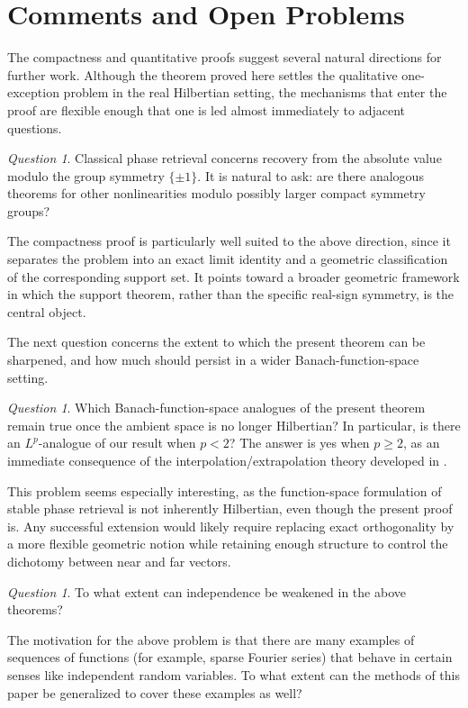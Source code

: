 \documentclass[11pt]{amsart}
\numberwithin{equation}{section}
\theoremstyle{definition}
\theoremstyle{remark}
\newtheorem{question}[theorem]{Question}
\begin{document}
\section{Comments and Open Problems}\label{sec:comments}

The compactness and quantitative proofs suggest several natural directions for
further work.  Although the theorem proved here settles the qualitative
one-exception problem in the real Hilbertian setting, the mechanisms that enter
the proof are flexible enough that one is led almost immediately to adjacent
questions. 


\begin{question}
Classical phase retrieval concerns recovery from the absolute value modulo the group symmetry $\{\pm1\}$.  It is
natural to ask: are there analogous theorems for other nonlinearities modulo possibly larger compact symmetry groups?  %
\end{question}

The compactness
proof is particularly well suited to the above direction, since it separates the
problem into an exact limit identity and a geometric classification of the
corresponding support set.  It points toward a broader geometric framework in which the
support theorem, rather than the specific real-sign symmetry, is the central
object.

The next question concerns the extent to which the present theorem can be
sharpened, and how much should persist in a wider Banach-function-space
setting.

\begin{question}
Which Banach-function-space analogues of the present theorem remain true once
the ambient space is no longer Hilbertian? In particular, is there an $L^p$-analogue of our result when $p<2$? The answer is yes when $p\geq 2$,
as an immediate consequence of the interpolation/extrapolation theory developed in \cite{FOTP}.%
\end{question}

This problem seems especially interesting, as the function-space formulation
of stable phase retrieval is not inherently Hilbertian, even though the present
proof is.  Any successful extension would likely require replacing
exact orthogonality by a more flexible geometric notion while retaining enough
structure to control the dichotomy between near and far vectors.
\begin{question}
To what extent can independence be weakened in the above theorems?
\end{question}
The motivation for the above problem is that there are many examples of sequences of functions (for example, sparse Fourier series) that behave in certain senses like independent random variables. To what extent can the methods of this paper be generalized to cover these examples as well?
\end{document}
